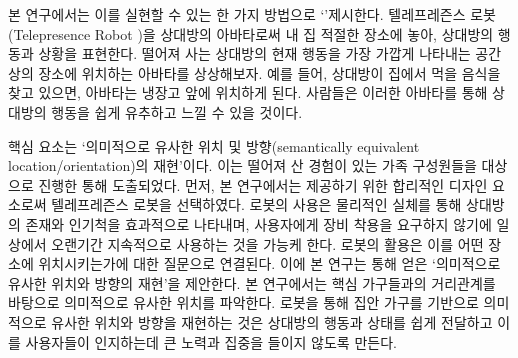 
본 연구에서는 이를 실현할 수 있는 한 가지 방법으로 `\approach'\을 제시한다. 텔레프레즌스 로봇(Telepresence Robot \cite{double_robotics})을 상대방의 아바타로써 내 집 적절한 장소에 놓아, 상대방의 행동과 상황을 표현한다. 떨어져 사는 상대방의 현재 행동을 가장 가깝게 나타내는 공간상의 장소에 위치하는 아바타를 상상해보자. 예를 들어, 상대방이 집에서 먹을 음식을 찾고 있으면, 아바타는 냉장고 앞에 위치하게 된다. 사람들은 이러한 아바타를 통해 상대방의 행동을 쉽게 유추하고 \concept\을 느낄 수 있을 것이다.




 핵심 요소는 `의미적으로 유사한 위치 및 방향(semantically equivalent location/orientation)의 재현'이다.
이는 떨어져 산 경험이 있는 가족 구성원들을 대상으로 진행한 \expWorkshop\을 통해 도출되었다.
먼저, 본 연구에서는  제공하기 위한 합리적인 디자인 요소로써 텔레프레즌스 로봇을 선택하였다.
로봇의 사용은 물리적인 실체를 통해 상대방의 존재와 인기척을 효과적으로 나타내며, 사용자에게 장비 착용을 요구하지 않기에 일상에서 오랜기간 지속적으로 사용하는 것을 가능케 한다.
로봇의 활용은 이를 어떤 장소에 위치시키는가에 대한 질문으로 연결된다. 이에 본 연구는  통해 얻은 `의미적으로 유사한 위치와 방향의 재현'을 제안한다. 본 연구에서는 핵심 가구들과의 거리관계를 바탕으로 의미적으로 유사한 위치를 파악한다.
로봇을 통해 집안 가구를 기반으로 의미적으로 유사한 위치와 방향을 재현하는 것은 상대방의 행동과 상태를 쉽게 전달하고 이를 사용자들이 인지하는데 큰 노력과 집중을 들이지 않도록 만든다. 


